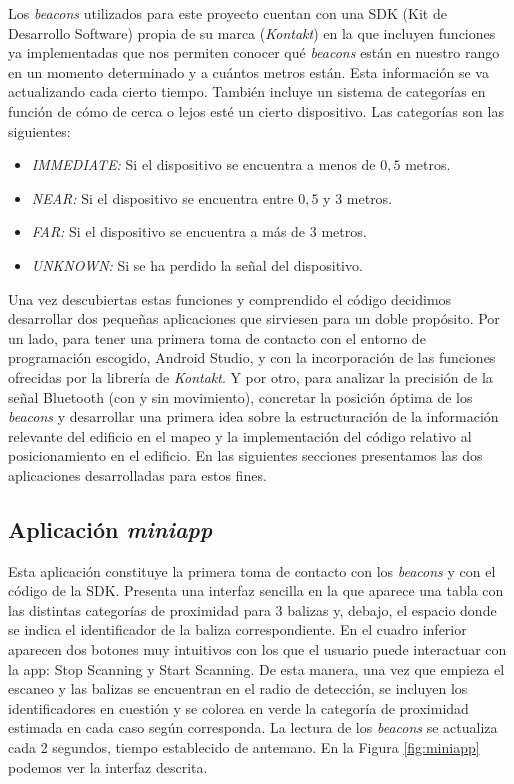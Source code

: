 Los \textit{beacons} utilizados para este proyecto cuentan con una SDK (Kit de Desarrollo Software) propia de su marca (\textit{Kontakt}) en la que incluyen funciones ya implementadas que nos permiten conocer qué \textit{beacons} están en nuestro rango en un momento determinado y a cuántos metros están. Esta información se va actualizando cada cierto tiempo. También incluye un sistema de categorías en función de cómo de cerca o lejos esté un cierto dispositivo. Las categorías son las siguientes:

\begin{itemize}
	\item \textit{IMMEDIATE:} Si el dispositivo se encuentra a menos de $0,5$ metros.
	\item \textit{NEAR:} Si el dispositivo se encuentra entre $0,5$ y $3$ metros.
	\item \textit{FAR:} Si el dispositivo se encuentra a más de $3$ metros.
	\item \textit{UNKNOWN:} Si se ha perdido la señal del dispositivo.
\end{itemize}

Una vez descubiertas estas funciones y comprendido el código decidimos desarrollar dos pequeñas aplicaciones que sirviesen para un doble propósito. Por un lado, para tener una primera toma de contacto con el entorno de programación escogido, Android Studio, y con la incorporación de las funciones ofrecidas por la librería de \textit{Kontakt}. Y por otro, para analizar la precisión de la señal Bluetooth (con y sin movimiento), concretar la posición óptima de los \textit{beacons} y desarrollar una primera idea sobre la estructuración de la información relevante del edificio en el mapeo y la implementación del código relativo al posicionamiento en el edificio. En las siguientes secciones presentamos las dos aplicaciones desarrolladas para estos fines.


\subsection{Aplicación \textit{miniapp}}
\label{sub:miniapp}
Esta aplicación constituye la primera toma de contacto con los \textit{beacons} y con el código de la SDK. Presenta una interfaz sencilla en la que aparece una tabla con las distintas categorías de proximidad para 3 balizas y, debajo, el espacio donde se indica el identificador de la baliza correspondiente. En el cuadro inferior aparecen dos botones muy intuitivos con los que el usuario puede interactuar con la app: Stop Scanning y Start Scanning. De esta manera, una vez que empieza el escaneo y las balizas se encuentran en el radio de detección, se incluyen los identificadores en cuestión y se colorea en verde la categoría de proximidad estimada en cada caso según corresponda. La lectura de los \textit{beacons} se actualiza cada 2 segundos, tiempo establecido de antemano. En la Figura \ref{fig:miniapp} podemos ver la interfaz descrita.

